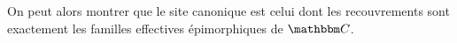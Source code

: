 \begin{cor}\label{caracCanon}
    On peut alors montrer que le site canonique est celui dont les recouvrements sont
    exactement les familles effectives épimorphiques de $\C$.
\end{cor}

